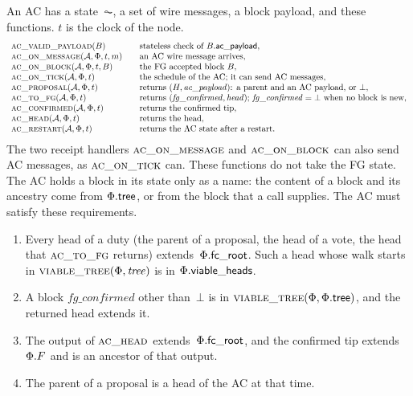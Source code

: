 An AC has a state~$\AC$, a set of wire messages, a block payload, and
these functions.  $t$ is the clock of the node.
\[
\begin{array}{l@{\qquad}l}
 \Call{ac\_valid\_payload}{B} & \text{stateless check of $B.\acp$},\\
 \Call{ac\_on\_message}{\AC,\Fr,t,m} & \text{an AC wire message arrives},\\
 \Call{ac\_on\_block}{\AC,\Fr,t,B} & \text{the FG accepted block $B$},\\
 \Call{ac\_on\_tick}{\AC,\Fr,t} & \text{the schedule of the AC; it can
   send AC messages},\\
 \Call{ac\_proposal}{\AC,\Fr,t} & \text{returns
   $(H,\mathit{ac\_payload})$: a parent and an AC payload, or $\bot$},\\
 \Call{ac\_to\_fg}{\AC,\Fr,t} & \text{returns
   $(\mathit{fg\_confirmed},\mathit{head})$; $\mathit{fg\_confirmed}=\bot$
   when no block is new},\\
 \Call{ac\_confirmed}{\AC,\Fr,t} & \text{returns the confirmed tip},\\
 \Call{ac\_head}{\AC,\Fr,t} & \text{returns the head},\\
 \Call{ac\_restart}{\AC,\Fr,t} & \text{returns the AC state after a restart}.
\end{array}
\]
The two receipt handlers $\Call{ac\_on\_message}{}$ and
$\Call{ac\_on\_block}{}$ can also send AC messages, as
$\Call{ac\_on\_tick}{}$ can.  These functions do not take the FG state.  The AC holds a block in its state only as
a name: the content of a block and its ancestry come from $\Phi.\mathsf{tree}$, or
from the block that a call supplies.  The AC must satisfy these
requirements.
\begin{enumerate}
\item Every head of a duty (the parent of a proposal, the head of a vote,
  the head that $\Call{ac\_to\_fg}{}$ returns) extends~$\Phi.\mathsf{fc\_root}$.
  Such a head whose walk starts in $\text{\textsc{viable\_tree}}(\Phi,\mathit{tree})$ is in
  $\Phi.\mathsf{viable\_heads}$.
\item A block $\mathit{fg\_confirmed}$ other than~$\bot$ is in
  $\text{\textsc{viable\_tree}}(\Phi,\Phi.\mathsf{tree})$, and the returned head extends it.
\item The output of $\Call{ac\_head}{}$ extends~$\Phi.\mathsf{fc\_root}$, and the
  confirmed tip extends~$\Phi.F$ and is an ancestor of that output.
\item The parent of a proposal is a head of the AC at that time.
\end{enumerate}


